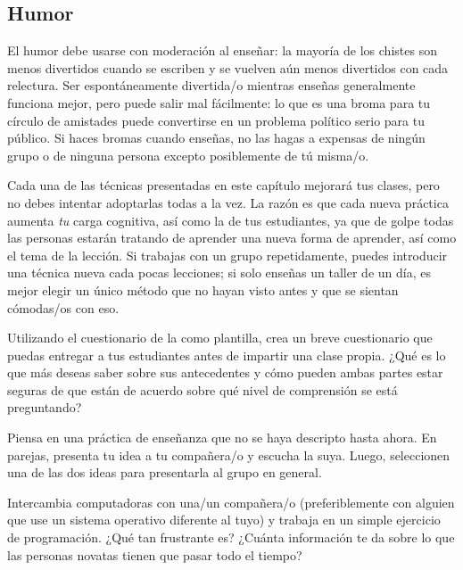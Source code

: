 \subsection*{Humor}

El humor debe usarse con moderación al enseñar:
la mayoría de los chistes son menos divertidos cuando se escriben
y se vuelven aún menos divertidos con cada relectura.
Ser espontáneamente divertida/o mientras enseñas generalmente funciona mejor,
pero puede salir mal fácilmente:
lo que es una broma para tu círculo de amistades
puede convertirse en un problema político serio para tu público.
Si haces bromas cuando enseñas,
no las hagas a expensas de ningún grupo
o de ninguna persona excepto posiblemente de tú misma/o.


Cada una de las técnicas presentadas en este capítulo mejorará tus clases,
pero no debes intentar adoptarlas todas a la vez.
La razón es que cada nueva práctica aumenta \emph{tu} carga cognitiva, así como la de tus estudiantes,
ya que de golpe todas las personas estarán tratando de aprender una nueva forma de aprender,
así como el tema de la lección.
Si trabajas con un grupo repetidamente,
puedes introducir una técnica nueva cada pocas lecciones;
si solo enseñas un taller de un día,
es mejor elegir un único método que no hayan visto antes
y que se sientan cómodas/os con eso.



Utilizando el cuestionario de la  como plantilla,
crea un breve cuestionario que puedas entregar a tus estudiantes antes de impartir una clase propia.
¿Qué es lo que más deseas saber sobre sus antecedentes
y cómo pueden ambas partes estar seguras de que están de acuerdo sobre qué nivel de comprensión se está preguntando?


Piensa en una práctica de enseñanza que no se haya descripto hasta ahora.
En parejas, presenta tu idea a tu compañera/o y escucha la suya. 
Luego, seleccionen una de las dos ideas para presentarla al grupo en general.


Intercambia computadoras con una/un compañera/o
(preferiblemente con alguien que use un sistema operativo diferente al tuyo)
y trabaja en un simple ejercicio de programación.
¿Qué tan frustrante es?
¿Cuánta información te da sobre lo que las personas novatas tienen que pasar todo el tiempo?

